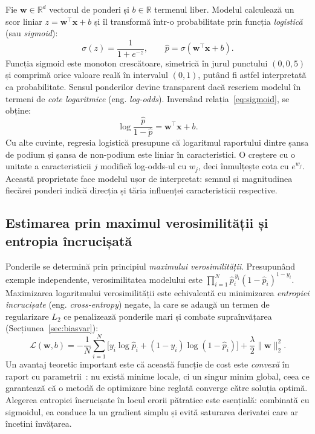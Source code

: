 \documentclass[12pt,a4paper]{report}
\begin{document}
Fie $\mathbf{w} \in \mathbb{R}^d$ vectorul de ponderi și $b \in \mathbb{R}$ termenul liber.
Modelul calculează un scor liniar $z = \mathbf{w}^\top \mathbf{x} + b$ și îl transformă într-o
probabilitate prin funcția \emph{logistică} (sau \emph{sigmoid}):
\begin{equation}
  \sigma(z) = \frac{1}{1 + e^{-z}}, \qquad \hat{p} = \sigma(\mathbf{w}^\top \mathbf{x} + b).
  \label{eq:sigmoid}
\end{equation}
Funcția sigmoid este monoton crescătoare, simetrică în jurul punctului $(0, 0{,}5)$ și comprimă
orice valoare reală în intervalul $(0, 1)$, putând fi astfel interpretată ca probabilitate.
Sensul ponderilor devine transparent dacă rescriem modelul în termeni de \emph{cote
logaritmice} (eng. \emph{log-odds}). Inversând relația~\eqref{eq:sigmoid}, se obține:
\begin{equation}
  \log \frac{\hat{p}}{1 - \hat{p}} = \mathbf{w}^\top \mathbf{x} + b.
  \label{eq:logit}
\end{equation}
Cu alte cuvinte, regresia logistică presupune că logaritmul raportului dintre șansa de podium și
șansa de non-podium este liniar în caracteristici. O creștere cu o unitate a caracteristicii $j$
modifică log-odds-ul cu $w_j$, deci înmulțește cota cu $e^{w_j}$. Această proprietate face
modelul ușor de interpretat: semnul și magnitudinea fiecărei ponderi indică direcția și tăria
influenței caracteristicii respective.

\subsection{Estimarea prin maximul verosimilității și entropia încrucișată}

Ponderile se determină prin principiul \emph{maximului verosimilității}. Presupunând exemple
independente, verosimilitatea modelului este $\prod_{i=1}^{N} \hat{p}_i^{\,y_i}(1 - \hat{p}_i)^{1 - y_i}$.
Maximizarea logaritmului verosimilității este echivalentă cu minimizarea \emph{entropiei
încrucișate} (eng. \emph{cross-entropy}) negate, la care se adaugă un termen de regularizare
$L_2$ ce penalizează ponderile mari și combate supraînvățarea (Secțiunea~\ref{sec:biasvar}):
\begin{equation}
  \mathcal{L}(\mathbf{w}, b) = -\frac{1}{N} \sum_{i=1}^{N} \Big[ y_i \log \hat{p}_i +
  (1 - y_i) \log (1 - \hat{p}_i) \Big] + \frac{\lambda}{2} \lVert \mathbf{w} \rVert_2^2 .
  \label{eq:bce}
\end{equation}
Un avantaj teoretic important este că această funcție de cost este \emph{convexă} în raport cu
parametrii~\cite{boyd2004convex}: nu există minime locale, ci un singur minim global, ceea ce
garantează că o metodă de optimizare bine reglată converge către soluția optimă. Alegerea
entropiei încrucișate în locul erorii pătratice este esențială: combinată cu sigmoidul, ea
conduce la un gradient simplu și evită saturarea derivatei care ar încetini învățarea.
\end{document}
